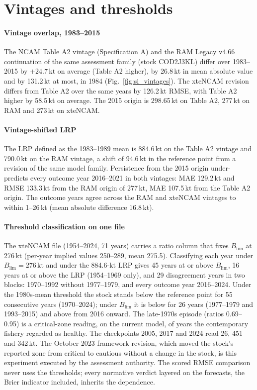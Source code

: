 \documentclass[preprint,11pt,authoryear]{elsarticle}
\theoremstyle{remark}
\newcommand{\kt}{\,\mathrm{kt}}
\newcommand{\Blim}{B_{\mathrm{lim}}}
\begin{document}
\section{Vintages and thresholds}\label{si:thresholds}

\paragraph{Vintage overlap, 1983--2015} The NCAM Table A2 vintage (Specification A) and the RAM Legacy v4.66 continuation of the same assessment family (stock COD2J3KL) differ over 1983--2015 by $+24.7\kt$ on average (Table A2 higher), by 26.8\,kt in mean absolute value and by 131.2\,kt at most, in 1984 (Fig.~\ref{fig:si_vintages}). The xteNCAM revision differs from Table A2 over the same years by 126.2\,kt RMSE, with Table A2 higher by 58.5\,kt on average. The 2015 origin is 298.65\,kt on Table A2, 277\,kt on RAM and 273\,kt on xteNCAM.

\paragraph{Vintage-shifted LRP} The LRP defined as the 1983--1989 mean is 884.6\,kt on the Table A2 vintage and 790.0\,kt on the RAM vintage, a shift of 94.6\,kt in the reference point from a revision of the same model family. Persistence from the 2015 origin under-predicts every outcome year 2016--2021 in both vintages: MAE 129.2\,kt and RMSE 133.3\,kt from the RAM origin of 277\,kt, MAE 107.5\,kt from the Table A2 origin. The outcome years agree across the RAM and xteNCAM vintages to within 1--26\,kt (mean absolute difference 16.8\,kt).

\paragraph{Threshold classification on one file} The xteNCAM file (1954--2024, 71 years) carries a ratio column that fixes $\Blim$ at 276\,kt (per-year implied values 250--289, mean 275.5). Classifying each year under $\Blim = 276\kt$ and under the 884.6-kt LRP gives 45 years at or above $\Blim$, 16 years at or above the LRP (1954--1969 only), and 29 disagreement years in two blocks: 1970--1992 without 1977--1979, and every outcome year 2016--2024. Under the 1980s-mean threshold the stock stands below the reference point for 55 consecutive years (1970--2024); under $\Blim$ it is below for 26 years (1977--1979 and 1993--2015) and above from 2016 onward. The late-1970s episode (ratios 0.69--0.95) is a critical-zone reading, on the current model, of years the contemporary fishery regarded as healthy. The checkpoints 2005, 2017 and 2024 read 26, 451 and 342\,kt. The October 2023 framework revision, which moved the stock's reported zone from critical to cautious without a change in the stock, is this experiment executed by the assessment authority. The scored RMSE comparison never uses the thresholds; every normative verdict layered on the forecasts, the Brier indicator included, inherits the dependence.
\end{document}
